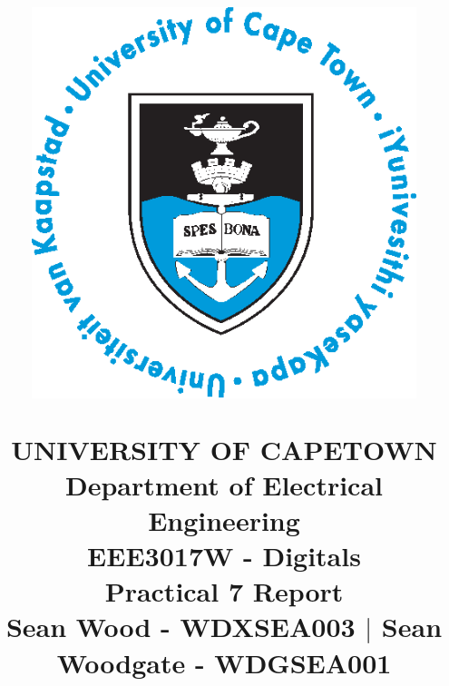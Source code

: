 
\newcommand{\reportTitle}{Practical 7 Report} %
\newcommand{\reportDueDate}{Wednesday,\ September\ 03,\ 2014}                    %
\newcommand{\reportClass}{EEE3017W - Digitals}                               %
\newcommand{\reportClassTime}{10:30am}                                 %
\newcommand{\reportClassInstructor}{Jones}                               %
\newcommand{\reportAuthorName}{Sean Wood - WDXSEA003 $|$ Sean Woodgate - WDGSEA001}                           %
\newcommand{\reportDepartment}{Department of Electrical Engineering}           %


\title{
\begin{figure}[H]
  \begin{center}
    \includegraphics[width=0.4\columnwidth]{uct-logo}
  \end{center}
\end{figure}
\textmd{\Huge UNIVERSITY OF CAPETOWN \\ \LARGE \reportDepartment} \\
\vspace{2in}
\textmd{\textbf{\LARGE \reportClass\\ \Huge \reportTitle \\ \vspace{1.5in} \Large \reportAuthorName}}\\
}

